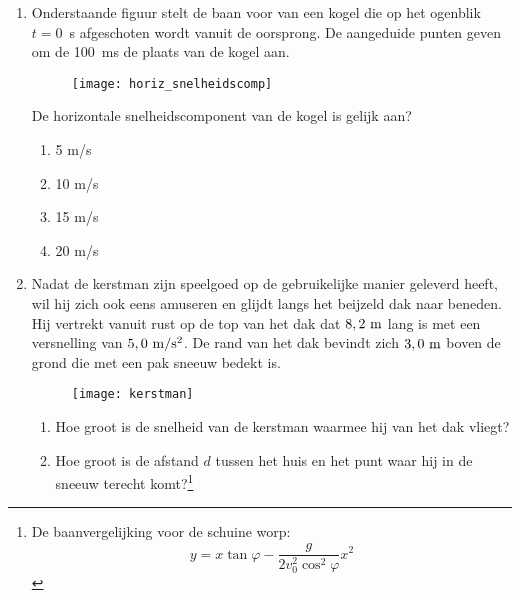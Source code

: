 \begin{enumerate}
\item Onderstaande figuur stelt de baan voor van
een kogel die op het ogenblik \mbox{$t=0$~s} afgeschoten wordt
vanuit de oorsprong. De aangeduide punten geven om de \mbox{100 ms}
de plaats van de kogel aan.
\begin{figure}[h]
\begin{center}
\texttt{[image: horiz\_snelheidscomp]}
\end{center}
\end{figure}
\newline
De horizontale snelheidscomponent van de kogel is gelijk aan?
\begin{enumerate}
\item 5 m/s
\item 10 m/s
\item 15 m/s
\item 20 m/s
\end{enumerate}

\item Nadat de kerstman zijn speelgoed op de
gebruikelijke manier geleverd heeft, wil hij zich ook eens amuseren
en glijdt langs het beijzeld dak naar beneden. Hij vertrekt vanuit
rust op de top van het dak dat $8,2~\rm m$ lang is met een
versnelling van $5,0~\rm m/s^2$. De rand van het dak bevindt zich
$3,0~\rm m$ boven de grond die met een pak sneeuw bedekt is.
\begin{figure}[h]
\begin{center}
\texttt{[image: kerstman]}
\end{center}
\end{figure}
\begin{enumerate}
\item Hoe groot is de snelheid van de kerstman waarmee hij van het
dak vliegt?
\item Hoe groot is de afstand $d$ tussen het huis en het punt waar
hij in de sneeuw terecht komt?\footnote{De baanvergelijking voor de
schuine worp:
\[
y=x\tan\varphi-\frac{g}{2v_0^2\cos^2\varphi}x^2
\]}
\end{enumerate}




\end{enumerate}
